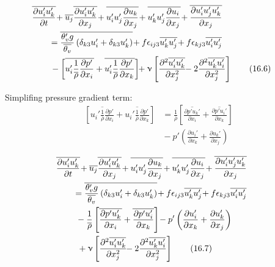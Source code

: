 \documentclass[fleqn,10pt]{SelfArx} %
\begin{document}
\begin{align*}
	\mspace{-30mu} \overline{\frac{\partial u_i'u_k'}{\partial t}} \! &+ \overline{u_j}\overline{\frac{\partial u_i'u_k'}{\partial x_j}} \! + \overline{u_i'u_j'\frac{\partial u_k}{\partial x_j}} \! + \overline{u_k'u_j'\frac{\partial u_i}{\partial x_j}} \! + \overline{\frac{\partial u_i'u_j'u_k'}{\partial x_j}} \\ &\!\!\!\! = \overline{\frac{\theta_v'g}{\overline{\theta_v}}\left(\delta_{k3}u_i' + \delta_{k3}u_k'\right)} \!+ f\epsilon_{ij3}\overline{u_k'u_j'} \! + f\epsilon_{kj3}\overline{u_i'u_j'} \\ &\!\!\! - \left[\overline{u_i'\frac{1}{\overline{\rho}}\frac{\partial p'}{\partial x_i}} + \overline{u_i'\frac{1}{\overline{\rho}}\frac{\partial p'}{\partial x_k}}\right] \!\! + \upnu\left[\frac{\partial^2 \overline{u_i'u_k'}}{\partial x_j^2} \!\! - 2\frac{\partial^2 \overline{u_k'u_i'}}{\partial x_j^2}\right] \tag{16.6} \label{eq:16.6}
\end{align*}

Simplifing pressure gradient term:
\begin{align*}
	\left[\overline{u_i'\frac{1}{\overline{\rho}}\frac{\partial p'}{\partial x_i}} + \overline{u_i'\frac{1}{\overline{\rho}}\frac{\partial p'}{\partial x_k}}\right] &= \frac{1}{\overline{\rho}}\left[\overline{\frac{\partial p'u_k'}{\partial x_i}} + \overline{\frac{\partial p'u_i'}{\partial x_k}}\right] \\ &\!- p'\left(\frac{\partial u_i'}{\partial x_k} + \frac{\partial u_k'}{\partial x_j}\right)
\end{align*}

\begin{align*}
	\mspace{-30mu} \overline{\frac{\partial u_i'u_k'}{\partial t}} \! &+ \overline{u_j}\overline{\frac{\partial u_i'u_k'}{\partial x_j}} \! + \overline{u_i'u_j'\frac{\partial u_k}{\partial x_j}} \! + \overline{u_k'u_j'\frac{\partial u_i}{\partial x_j}} \! + \overline{\frac{\partial u_i'u_j'u_k'}{\partial x_j}} \\ &\!\!\!\! = \overline{\frac{\theta_v'g}{\overline{\theta_v}}\left(\delta_{k3}u_i' + \delta_{k3}u_k'\right)} \!+ f\epsilon_{ij3}\overline{u_k'u_j'} \! + f\epsilon_{kj3}\overline{u_i'u_j'} \\ &\!\! - \frac{1}{\overline{\rho}}\left[\overline{\frac{\partial p'u_k'}{\partial x_i}} + \overline{\frac{\partial p'u_i'}{\partial x_k}}\right] \!- p'\left(\frac{\partial u_i'}{\partial x_k} + \frac{\partial u_k'}{\partial x_j}\right) \\ &\! + \upnu\left[\frac{\partial^2 \overline{u_i'u_k'}}{\partial x_j^2} \!\! - 2\frac{\partial^2 \overline{u_k'u_i'}}{\partial x_j^2}\right] \tag{16.7} \label{eq:16.7}
\end{align*}


\clearpage


\end{document}
